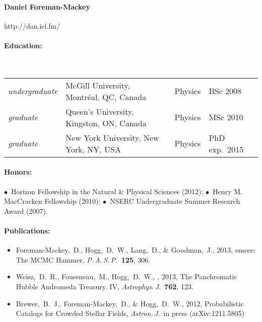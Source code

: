 \documentclass[letterpaper,12pt]{article}
\begin{document}
\paragraph{Daniel Foreman-Mackey} http://dan.iel.fm/

\paragraph{Education:}~\\
\begin{tabular}{llll}
\textsl{undergraduate}
  & McGill University, Montr\'eal, QC, Canada & Physics & BSc 2008\\
\textsl{graduate}
  & Queen's University, Kingston, ON, Canada & Physics & MSc 2010\\
\textsl{graduate}
  & New York University, New York, NY, USA & Physics & PhD exp.\ 2015
\end{tabular}

\paragraph{Honors:}
$\bullet$~Horizon Fellowship in the Natural \& Physical Sciences (2012);
$\bullet$~Henry M. MacCracken Fellowship (2010);
$\bullet$~NSERC Undergraduate Summer Research Award (2007).

\paragraph{Publications:}
\begin{itemize}\setlength{\itemsep}{0pt}
\item
Foreman-Mackey,~D., Hogg,~D.~W., Lang,~D., \& Goodman,~J., 2013,
emcee: The MCMC Hammer, \textit{P.\,A.\,S.\,P.}\ \textbf{125}, 306.
\item
Weisz,~D.~R., Fouesneau,~M., Hogg,~D.~W., \etal, 2013,
The Panchromatic Hubble Andromeda Treasury. IV,
\textit{Astrophys.\,J.}\ \textbf{762}, 123.
\item
Brewer,~B.~J., Foreman-Mackey,~D., \& Hogg,~D.~W., 2012,
Probabilistic Catalogs for Crowded Stellar Fields,
\textit{Astron.\,J.}\ in press (arXiv:1211.5805)
\end{itemize}
\end{document}

